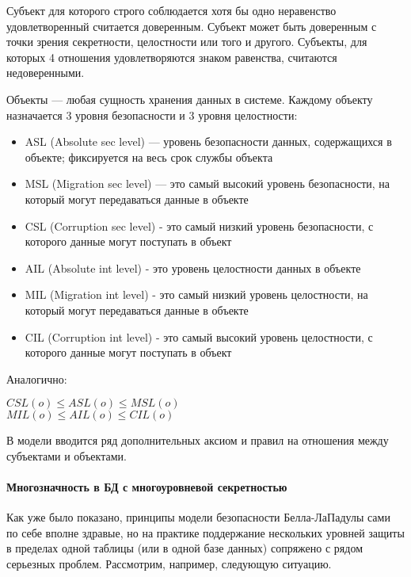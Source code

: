 Субъект для которого строго соблюдается хотя бы одно неравенство удовлетворенный считается доверенным. Субъект может
быть доверенным с точки зрения секретности, целостности или того и другого. Субъекты, для которых 4 отношения
удовлетворяются знаком равенства, считаются недоверенными.

Объекты --- любая сущность хранения данных в системе. Каждому объекту назначается 3 уровня безопасности и
3 уровня целостности:
\begin{itemize}
    \item ASL (Absolute sec level) --- уровень безопасности данных, содержащихся в объекте; фиксируется на весь срок
    службы объекта
    \item MSL (Migration sec level) --- это самый высокий уровень безопасности, на который могут передаваться данные
    в объекте
    \item CSL (Corruption sec level) - это самый низкий уровень безопасности, с которого данные могут поступать в объект
    \item AIL (Absolute int level) - это уровень целостности данных в объекте
    \item MIL (Migration int level) - это самый низкий уровень целостности, на который могут передаваться данные в объекте
    \item CIL (Corruption int level) - это самый высокий уровень целостности, с которого данные могут поступать в объект
\end{itemize}

Аналогично:

\begin{center}
$CSL(o) \leqslant ASL(o) \leq MSL(o)$ \\
$MIL(o) \leqslant AIL(o) \leq CIL(o)$
\end{center}

В модели вводится ряд дополнительных аксиом и правил на отношения между субъектами и объектами.

\paragraph{Многозначность в БД с многоуровневой секретностью}

Как уже было показано,  принципы модели безопасности Белла-ЛаПадулы сами по себе вполне здравые,  но на практике поддержание нескольких уровней защиты в пределах одной таблицы (или в одной базе данных) сопряжено с рядом серьезных проблем.  Рассмотрим, например, следующую ситуацию.

